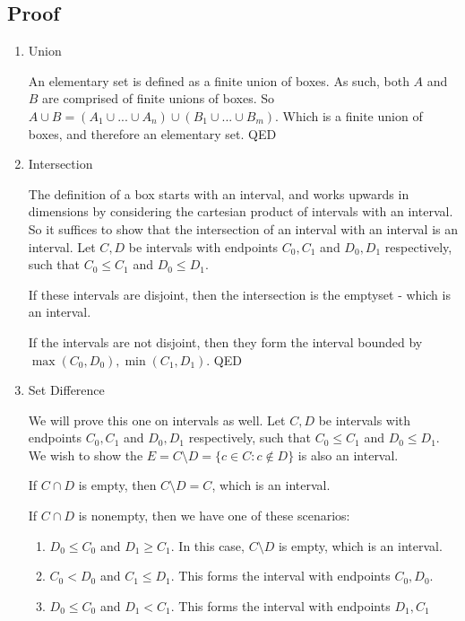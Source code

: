 \documentclass{article}
\begin{document}
\subsection{Proof}
\begin{enumerate}
\item Union

An elementary set is defined as a finite union of boxes. As such, both $A$ and $B$ are comprised of finite unions of boxes. So $A \cup B = (A_1 \cup ... \cup A_n) \cup (B_1 \cup ... \cup B_m)$. Which is a finite union of boxes, and therefore an elementary set. QED

\item Intersection

The definition of a box starts with an interval, and works upwards in dimensions by considering the cartesian product of intervals with an interval. So it suffices to show that the intersection of an interval with an interval is an interval. Let $C, D$ be intervals with endpoints $C_0, C_1$ and  $D_0, D_1$ respectively, such that $C_0 \leq C_1$ and $D_0 \leq D_1$. 

If these intervals are disjoint, then the intersection is the emptyset - which is an interval. 

If the intervals are not disjoint, then they form the interval bounded by $\max(C_0, D_0), \min(C_1, D_1)$. QED

\item Set Difference

We will prove this one on intervals as well. Let $C, D$ be intervals with endpoints $C_0, C_1$ and  $D_0, D_1$ respectively, such that $C_0 \leq C_1$ and $D_0 \leq D_1$. We wish to show the $E = C\setminus D = \{c \in C : c \notin D\}$ is also an interval. 

If $C \cap D$ is empty, then $C\setminus D = C$, which is an interval. 

If $C \cap D$ is nonempty, then we have one of these scenarios:

\begin{enumerate}
\item $D_0 \leq C_0$ and $D_1 \geq C_1$. In this case, $C \setminus D$ is empty, which is an interval. 

\item $C_0 < D_0$ and $C_1 \leq D_1$. This forms the interval with endpoints $C_0, D_0$. 

\item $D_0 \leq C_0$ and $D_1 < C_1$. This forms the interval with endpoints $D_1, C_1$


\end{enumerate}
\end{enumerate}
\end{document}
